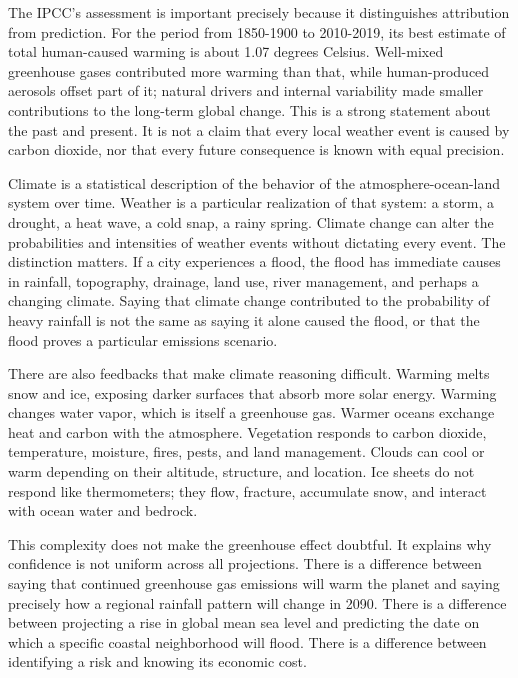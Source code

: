 ﻿\documentclass[12pt,a4paper]{book}
\begin{document}
The IPCC's assessment is important precisely because it distinguishes attribution from prediction. For the period from 1850-1900 to 2010-2019, its best estimate of total human-caused warming is about 1.07 degrees Celsius. Well-mixed greenhouse gases contributed more warming than that, while human-produced aerosols offset part of it; natural drivers and internal variability made smaller contributions to the long-term global change. This is a strong statement about the past and present. It is not a claim that every local weather event is caused by carbon dioxide, nor that every future consequence is known with equal precision. \cite{IPCC2021HumanInfluence,IPCC2023Synthesis}

Climate is a statistical description of the behavior of the atmosphere-ocean-land system over time. Weather is a particular realization of that system: a storm, a drought, a heat wave, a cold snap, a rainy spring. Climate change can alter the probabilities and intensities of weather events without dictating every event. The distinction matters. If a city experiences a flood, the flood has immediate causes in rainfall, topography, drainage, land use, river management, and perhaps a changing climate. Saying that climate change contributed to the probability of heavy rainfall is not the same as saying it alone caused the flood, or that the flood proves a particular emissions scenario.

There are also feedbacks that make climate reasoning difficult. Warming melts snow and ice, exposing darker surfaces that absorb more solar energy. Warming changes water vapor, which is itself a greenhouse gas. Warmer oceans exchange heat and carbon with the atmosphere. Vegetation responds to carbon dioxide, temperature, moisture, fires, pests, and land management. Clouds can cool or warm depending on their altitude, structure, and location. Ice sheets do not respond like thermometers; they flow, fracture, accumulate snow, and interact with ocean water and bedrock.

This complexity does not make the greenhouse effect doubtful. It explains why confidence is not uniform across all projections. There is a difference between saying that continued greenhouse gas emissions will warm the planet and saying precisely how a regional rainfall pattern will change in 2090. There is a difference between projecting a rise in global mean sea level and predicting the date on which a specific coastal neighborhood will flood. There is a difference between identifying a risk and knowing its economic cost.
\end{document}
